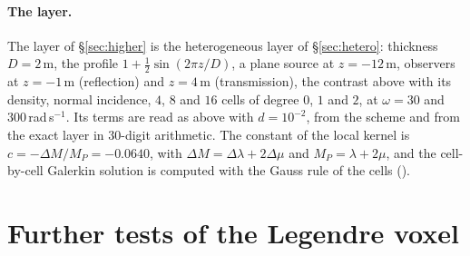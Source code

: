 \documentclass[11pt,a4paper]{article}
\begin{document}
\paragraph{The layer.} The layer of \S\ref{sec:higher} is the heterogeneous layer of \S\ref{sec:hetero}: thickness
$D=2$\,m, the profile $1+\tfrac12\sin(2\pi z/D)$, a plane source at $z=-12$\,m, observers at
$z=-1$\,m (reflection) and $z=4$\,m (transmission), the contrast above with its density, normal
incidence, $4$, $8$ and $16$ cells of degree $0$, $1$ and $2$, at $\omega=30$ and $300$\,rad\,s$^{-1}$.
Its terms are read as above with $d=10^{-2}$, from the scheme and from the exact layer in $30$-digit
arithmetic. The constant of the local kernel is $c=-\Delta M/M_P=-0.0640$, with $\Delta M=\Delta\lambda+2\Delta\mu$
and $M_P=\lambda+2\mu$, and the cell-by-cell Galerkin solution is computed with the Gauss rule of the
cells ().


\section{Further tests of the Legendre voxel}\label{app:legendre}
\end{document}
